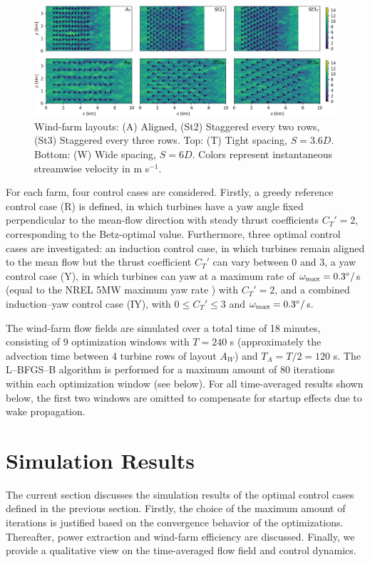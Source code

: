 \documentclass[a4paper]{jpconf}
\begin{document}
\begin{figure}
	\includegraphics[width=\textwidth]{Torque18/eps/drawing.eps}
	\caption{Wind-farm layouts: (A) Aligned, (St2) Staggered every two rows, (St3) Staggered every three rows. Top: (T) Tight spacing, $S= 3.6D$. Bottom: (W) Wide spacing, $S = 6D$. Colors represent instantaneous streamwise velocity in m s$^{-1}$.\label{fig:wf_layouts}}
\end{figure}


For each farm, four control cases are considered. Firstly, a greedy reference control case (R) is defined, in which turbines have a yaw angle fixed perpendicular to
the mean-flow direction with steady thrust coefficients $C_T' = 2$, corresponding to the Betz-optimal value. Furthermore, three optimal control cases
are investigated: an induction control case, in which turbines remain aligned to the mean flow but the thrust coefficient $C_T'$ can vary between 0
and 3, a yaw control case (Y), in which turbines can yaw at a maximum rate of $\omega_{\rm max} = 0.3^\circ /$s (equal to the NREL 5MW maximum yaw
rate ) with $C_T' = 2$, and a combined induction--yaw control case (IY), with $0 \leq C_T' \leq 3$ and $\omega_{\rm max} = 0.3^\circ/$s. 

The wind-farm flow fields are simulated over a total time of 18 minutes, consisting of 9 optimization windows with $T = 240$ s (approximately the advection time between 4 turbine rows of layout $A_W$) and $T_A = T/2 = 120$ s.
The {L--BFGS--B} algorithm is performed for a maximum amount of 80 iterations within each optimization window (see below). 
For all time-averaged results shown below, the first two windows are omitted to compensate for startup effects due to wake propagation.

\section{Simulation Results}\label{sec:results}
The current section discusses the simulation results of the optimal control cases defined in the previous section. Firstly, the choice of the maximum
amount of iterations is justified based on the convergence behavior of the optimizations. Thereafter, power extraction and wind-farm efficiency are
discussed. Finally, we provide a qualitative view on the time-averaged flow field and control dynamics. 
\end{document}
